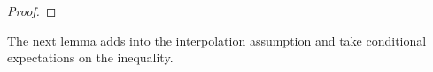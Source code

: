 \documentclass[12pt]{article}
\begin{document}
    \begin{proof}
        
    \end{proof}
    The next lemma adds into the interpolation assumption and take conditional expectations on the inequality. 
\end{document}

